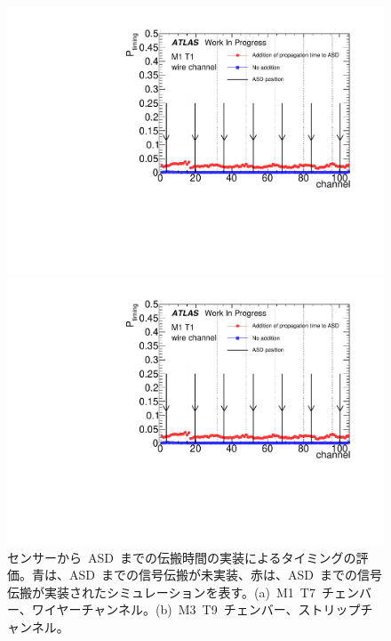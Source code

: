 \begin{figure}[tbp]
    \begin{minipage}{0.49\hsize}
    \centering   
    \includegraphics[width=\textwidth,page=8]{img/plot/ASD.pdf}
    \subcaption{}
    \end{minipage}
    \begin{minipage}{0.49\hsize}
    \centering   
    \includegraphics[width=\textwidth,page=35]{img/plot/ASD.pdf}
    \subcaption{}
    \end{minipage}
    \caption[センサーから~ASD~までの伝搬時間の実装によるタイミングの評価]{センサーから~ASD~までの伝搬時間の実装によるタイミングの評価。青は、ASD~までの信号伝搬が未実装、赤は、ASD~までの信号伝搬が実装されたシミュレーションを表す。(a)~M1~T7~チェンバー、ワイヤーチャンネル。(b)~M3~T9~チェンバー、ストリップチャンネル。}
    \label{fig:asd}
\end{figure}


